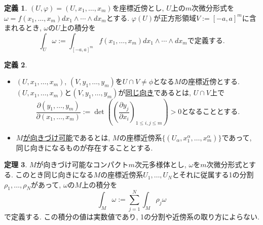 \documentclass[dvipdfmx,a4paper,11pt]{article}
\theoremstyle{definition}
\newtheorem{thm}{定理}
\newtheorem{dfn}[thm]{定義}
\newcommand{\pdrv}[2]{\frac{\partial #1}{\partial #2}}
\begin{document}
 
  \begin{tcolorbox}[
    colback = white,
    colframe = green!35!black,
    fonttitle = \bfseries,
    breakable = true]
\begin{dfn}
\label{integral_local}
$(U, \varphi) = (U, x_1, \ldots, x_m)$を座標近傍とし, $U$上の$m$次微分形式を$\omega = f(x_1, \ldots, x_m)dx_1 \wedge \cdots \wedge dx_m$とする.
$\varphi(U)$が正方形領域$V:=[-a,a]^{m}$に含まれるとき, $\omega$の$U$上の積分を
$$
\int_{U} \omega := \int_{[-a,a]^{m}}f(x_1, \ldots, x_m)dx_1 \wedge \cdots \wedge dx_m
\text{で定義する.}
$$
    \end{dfn}
    \end{tcolorbox} 
    
 \begin{tcolorbox}[
    colback = white,
    colframe = green!35!black,
    fonttitle = \bfseries,
    breakable = true]
\begin{dfn}

\begin{itemize}
 \setlength{\parskip}{0cm}
  \setlength{\itemsep}{2pt} 
\item $(U, x_1, \ldots, x_m)$, $(V, y_1, \ldots, y_m)$を$U \cap V \neq \phi$となる$M$の座標近傍とする.
$(U, x_1, \ldots, x_m)$と$(V, y_1, \ldots, y_m)$が\underline{同じ向き}であるとは, $U \cap V$上で
$$
\pdrv{(y_1, \ldots, y_m)}{(x_1, \ldots, x_m)}:=\det(\left( \pdrv{y_j}{x_i} \right)_{1\le i,j \le m}) >0
\text{となることとする.}
$$
\item \underline{$M$が向きづけ可能}であるとは, $M$の座標近傍系$\{ (U_{\alpha}, x_{1}^{\alpha}, \ldots, x_{m}^{\alpha})\}$であって, 同じ向きになるものが存在することとする.
\end{itemize}
    \end{dfn}
    \end{tcolorbox} 

  \begin{tcolorbox}[
    colback = white,
    colframe = green!35!black,
    fonttitle = \bfseries,
    breakable = true]
\begin{thm}
$M$が向きづけ可能なコンパクト$m$次元多様体とし, $\omega$を$m$次微分形式とする.
このとき同じ向きになる$M$の座標近傍系$U_1, \ldots, U_N$とそれに従属する1の分割$\rho_{1}, \ldots, \rho_{N}$があって,
$\omega$の$M$上の積分を
$$
\int_{M} \omega := \sum_{j=1}^{N} \int_{M} \rho_j \omega
$$
で定義する. この積分の値は実数値であり, 1の分割や近傍系の取り方によらない. 
    \end{thm}
    \end{tcolorbox} 
\end{document}
